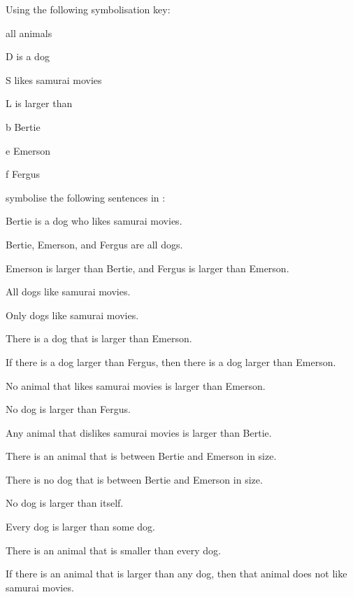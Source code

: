 \problempart 
Using the following symbolisation key:
\begin{ekey}
\item[\domain] all animals
\item[D]  is a dog
\item[S]  likes samurai movies
\item[L]  is larger than 
\item[b] Bertie
\item[e] Emerson
\item[f] Fergus
\end{ekey}
symbolise the following sentences in \FOL:
\begin{earg}
\item Bertie is a dog who likes samurai movies.
\item Bertie, Emerson, and Fergus are all dogs.
\item Emerson is larger than Bertie, and Fergus is larger than Emerson.
\item All dogs like samurai movies.
\item Only dogs like samurai movies.
\item There is a dog that is larger than Emerson.
\item If there is a dog larger than Fergus, then there is a dog larger than Emerson.
\item No animal that likes samurai movies is larger than Emerson.
\item No dog is larger than Fergus.
\item Any animal that dislikes samurai movies is larger than Bertie.
\item There is an animal that is between Bertie and Emerson in size.
\item There is no dog that is between Bertie and Emerson in size.
\item No dog is larger than itself.
\item Every dog is larger than some dog.
\item There is an animal that is smaller than every dog.
\item If there is an animal that is larger than any dog, then that animal does not like samurai movies.
\end{earg}

